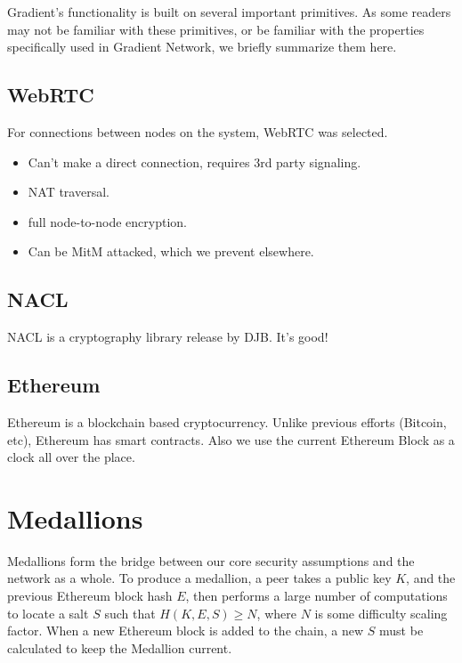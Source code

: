 \documentclass{article}
\begin{document}
Gradient’s functionality is built on several important primitives. As some readers may not be familiar with these primitives, or be familiar with the properties specifically used in Gradient Network, we briefly summarize them here.

\subsection{WebRTC}

For connections between nodes on the system, WebRTC was selected.

\begin{itemize}
    \item Can’t make a direct connection, requires 3rd party signaling.
    \item NAT traversal.
    \item full node-to-node encryption.
    \item Can be MitM attacked, which we prevent elsewhere.
\end{itemize}

\subsection{NACL}

NACL is a cryptography library release by DJB. It’s good!

\subsection{Ethereum}

Ethereum is a blockchain based cryptocurrency. Unlike previous efforts (Bitcoin, etc), Ethereum has smart contracts. Also we use the current Ethereum Block as a clock all over the place.

\section{Medallions}
\label{medallions}

Medallions form the bridge between our core security assumptions and the network as a whole. To produce a medallion, a peer takes a public key $K$, and the previous Ethereum block hash $E$, then performs a large number of computations to locate a salt $S$ such that $H(K, E, S) \geq N$, where $N$ is some difficulty scaling factor. When a new Ethereum block is added to the chain, a new $S$ must be calculated to keep the Medallion current.
\end{document}

